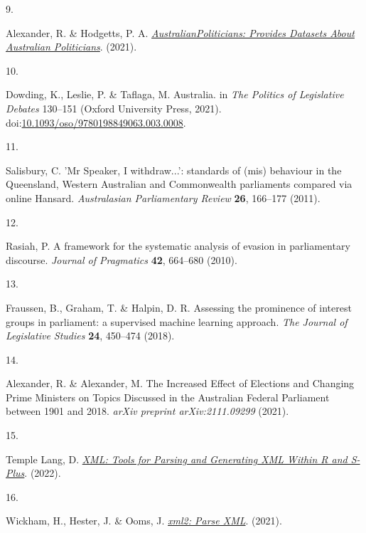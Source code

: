 \documentclass[
  letterpaper,
  DIV=11,
  numbers=noendperiod]{scrartcl}
\newlength{\cslhangindent}
\newlength{\csllabelwidth}
\newlength{\cslentryspacingunit} %
\newenvironment{CSLReferences}[2] %
 {%
  \setlength{\parindent}{0pt}
  \ifodd #1
  \let\oldpar\par
  \def\par{\hangindent=\cslhangindent\oldpar}
  \fi
  \setlength{\parskip}{#2\cslentryspacingunit}
 }%
 {}
\newcommand{\CSLLeftMargin}[1]{\parbox[t]{\csllabelwidth}{#1}}
\newcommand{\CSLRightInline}[1]{\parbox[t]{\linewidth - \csllabelwidth}{#1}\break}
\begin{document}
\begin{CSLReferences}{0}{0}
\leavevmode{}%
\CSLLeftMargin{9. }%
\CSLRightInline{Alexander, R. \& Hodgetts, P. A.
\emph{\href{https://CRAN.R-project.org/package=AustralianPoliticians}{{AustralianPoliticians:
Provides Datasets About Australian Politicians}}}. (2021).}

\leavevmode{}%
\CSLLeftMargin{10. }%
\CSLRightInline{Dowding, K., Leslie, P. \& Taflaga, M. {Australia}. in
\emph{{The Politics of Legislative Debates}} 130--151 (Oxford University
Press, 2021).
doi:\href{https://doi.org/10.1093/oso/9780198849063.003.0008}{10.1093/oso/9780198849063.003.0008}.}

\leavevmode{}%
\CSLLeftMargin{11. }%
\CSLRightInline{Salisbury, C. {'Mr Speaker, I withdraw...': standards of
(mis) behaviour in the Queensland, Western Australian and Commonwealth
parliaments compared via online Hansard}. \emph{Australasian
Parliamentary Review} \textbf{26}, 166--177 (2011).}

\leavevmode{}%
\CSLLeftMargin{12. }%
\CSLRightInline{Rasiah, P. {A framework for the systematic analysis of
evasion in parliamentary discourse}. \emph{Journal of Pragmatics}
\textbf{42}, 664--680 (2010).}

\leavevmode{}%
\CSLLeftMargin{13. }%
\CSLRightInline{Fraussen, B., Graham, T. \& Halpin, D. R. {Assessing the
prominence of interest groups in parliament: a supervised machine
learning approach}. \emph{The Journal of Legislative Studies}
\textbf{24}, 450--474 (2018).}

\leavevmode{}%
\CSLLeftMargin{14. }%
\CSLRightInline{Alexander, R. \& Alexander, M. {The Increased Effect of
Elections and Changing Prime Ministers on Topics Discussed in the
Australian Federal Parliament between 1901 and 2018}. \emph{arXiv
preprint arXiv:2111.09299} (2021).}

\leavevmode{}%
\CSLLeftMargin{15. }%
\CSLRightInline{Temple Lang, D.
\emph{\href{https://CRAN.R-project.org/package=XML}{{XML: Tools for
Parsing and Generating XML Within R and S-Plus}}}. (2022).}

\leavevmode{}%
\CSLLeftMargin{16. }%
\CSLRightInline{Wickham, H., Hester, J. \& Ooms, J.
\emph{\href{https://CRAN.R-project.org/package=xml2}{{xml2: Parse
XML}}}. (2021).}


\end{CSLReferences}
\end{document}
